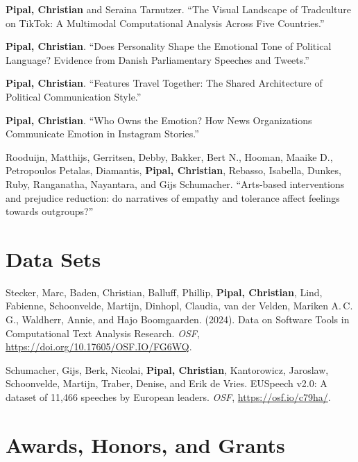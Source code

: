 \documentclass[11pt,a4paper]{article}
\begin{document}
\begin{enumerate}[leftmargin=2em, label={[\arabic*]}]
\item \textbf{Pipal, Christian} and Seraina Tarnutzer. ``The Visual Landscape of Tradculture on TikTok: A Multimodal Computational Analysis Across Five Countries.''
\item \textbf{Pipal, Christian}. ``Does Personality Shape the Emotional Tone of Political Language? Evidence from Danish Parliamentary Speeches and Tweets.''
\item \textbf{Pipal, Christian}. ``Features Travel Together: The Shared Architecture of Political Communication Style.''
\item \textbf{Pipal, Christian}. ``Who Owns the Emotion? How News Organizations Communicate Emotion in Instagram Stories.''
\item Rooduijn, Matthijs, Gerritsen, Debby, Bakker, Bert N., Hooman, Maaike D., Petropoulos Petalas, Diamantis, \textbf{Pipal, Christian}, Rebasso, Isabella, Dunkes, Ruby, Ranganatha, Nayantara, and Gijs Schumacher. ``Arts-based interventions and prejudice reduction: do narratives of empathy and tolerance affect feelings towards outgroups?''



\end{enumerate}


\section{Data Sets}

\begin{enumerate}[leftmargin=2em, label={[\arabic*]}]
\item Stecker, Marc, Baden, Christian, Balluff, Phillip, \textbf{Pipal, Christian}, Lind, Fabienne, Schoonvelde, Martijn, Dinhopl, Claudia, van der Velden, Mariken A.\,C.\,G., Waldherr, Annie, and Hajo Boomgaarden. (2024). Data on Software Tools in Computational Text Analysis Research. \textit{OSF}, \url{https://doi.org/10.17605/OSF.IO/FG6WQ}.
\item Schumacher, Gijs, Berk, Nicolai, \textbf{Pipal, Christian}, Kantorowicz, Jaroslaw, Schoonvelde, Martijn, Traber, Denise, and Erik de Vries. EUSpeech v2.0: A dataset of 11,466 speeches by European leaders. \textit{OSF}, \url{https://osf.io/c79ha/}.
\end{enumerate}


\section{Awards, Honors, and Grants}
\end{document}
